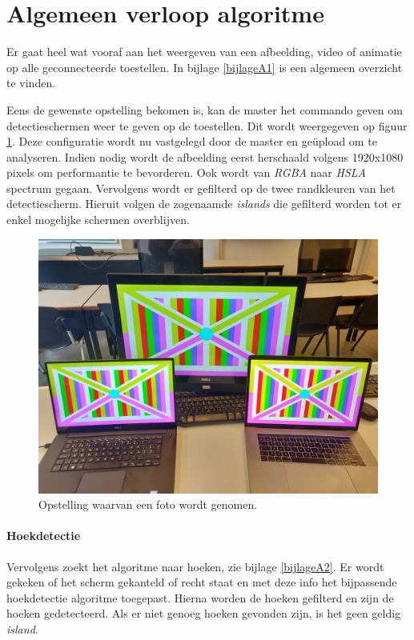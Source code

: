 \section{Algemeen verloop algoritme}
Er gaat heel wat vooraf aan het weergeven van een afbeelding, video of animatie op alle geconnecteerde toestellen. In bijlage \ref{bijlageA1} is een algemeen overzicht te vinden.

Eens de gewenste opstelling bekomen is, kan de master het commando geven om detectieschermen weer te geven op de toestellen. Dit wordt weergegeven op figuur \ref{fig:opstelling}. Deze configuratie wordt nu vastgelegd door de master en geüpload om te analyseren. Indien nodig wordt de afbeelding eerst herschaald volgens 1920x1080 pixels om performantie te bevorderen. Ook wordt van {\it RGBA} naar {\it HSLA} spectrum gegaan. Vervolgens wordt er gefilterd op de twee randkleuren van het detectiescherm. Hieruit volgen de zogenaamde {\it islands} die gefilterd worden tot er enkel mogelijke schermen overblijven.

\begin{figure}[H]
	\centering
	\includegraphics[scale=0.06]{img/opstelling.jpg}
	\caption{Opstelling waarvan een foto wordt genomen.}
	\label{fig:opstelling}
\end{figure}

\paragraph{Hoekdetectie}
Vervolgens zoekt het algoritme naar hoeken, zie bijlage \ref{bijlageA2}. Er wordt gekeken of het scherm gekanteld of recht staat en met deze info het bijpassende hoekdetectie algoritme toegepast. Hierna worden de hoeken gefilterd en zijn de hoeken gedetecteerd. Als er niet genoeg hoeken gevonden zijn, is het geen geldig {\it island}.

